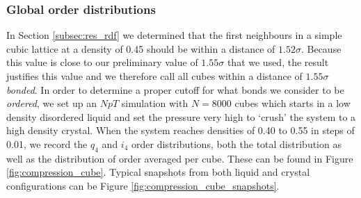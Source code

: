 \documentclass[thesis]{subfiles}
\begin{document}
\subsubsection{Global order distributions}\label{subsec:res_order cutoff}

In Section \ref{subsec:res_rdf} we determined that the first neighbours in a simple cubic lattice at a density of 0.45 should be within a distance of $1.52\sigma$. Because this value is close to our preliminary value of $1.55\sigma$ that we used, the result justifies this value and we therefore call all cubes within a distance of $1.55\sigma$ \emph{bonded}.
In order to determine a proper cutoff for what bonds we consider to be \emph{ordered}, we set up an $NpT$ simulation with $N = 8000$ cubes which starts in a low density disordered liquid and set the pressure very high to `crush' the system to a high density crystal. When the system reaches densities of 0.40 to 0.55 in steps of 0.01, we record the $q_4$ and $i_4$ order distributions, both the total distribution as well as the distribution of order averaged per cube. These can be found in Figure \ref{fig:compression_cube}. Typical snapshots from both liquid and crystal configurations can be Figure \ref{fig:compression_cube_snapshots}.
\end{document}
